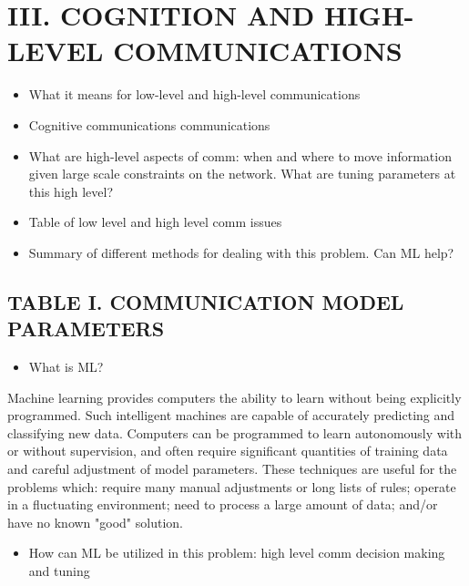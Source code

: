 \documentclass[11pt]{article}
\begin{document}
\section*{III. COGNITION AND HIGH-LEVEL COMMUNICATIONS}
\label{sec:org5a08676}

\begin{itemize}
\item What it means for low-level and high-level communications

\item Cognitive communications communications

\item What are high-level aspects of comm: when and where to move information given
large scale constraints on the network. What are tuning parameters at this
high level?

\item Table of low level and high level comm issues

\item Summary of different methods for dealing with this problem. Can ML help?
\end{itemize}

\subsection*{TABLE I. COMMUNICATION MODEL PARAMETERS}
\label{sec:orga3f91fc}

\begin{itemize}
\item What is ML?
\end{itemize}

Machine learning provides computers the ability to learn without being
explicitly programmed.  Such intelligent machines are capable of accurately
predicting and classifying new data.  Computers can be programmed to learn
autonomously with or without supervision, and often require significant
quantities of training data and careful adjustment of model parameters.  These
techniques are useful for the problems which: require many manual adjustments or
long lists of rules; operate in a fluctuating environment; need to process a
large amount of data; and/or have no known "good" solution.

\begin{itemize}
\item How can ML be utilized in this problem: high level comm decision making and
tuning
\end{itemize}
\end{document}
